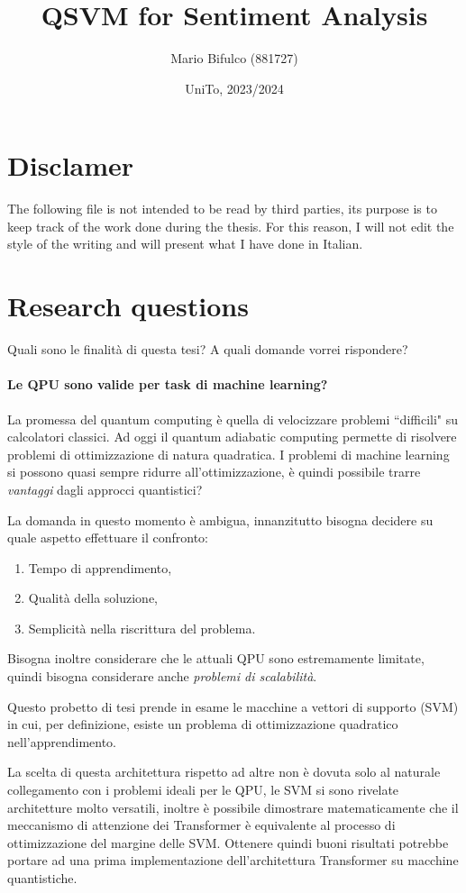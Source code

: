 \documentclass[12pt]{article}
\title{QSVM for Sentiment Analysis}
\author{Mario Bifulco (881727)}
\date{UniTo, 2023/2024}
\begin{document}
\maketitle

\section{Disclamer}

The following file is not intended to be read by third parties, 
its purpose is to keep track of the work done during the thesis. 
For this reason, I will not edit the style of the writing and will present what I have done in Italian.

\section{Research questions}

Quali sono le finalità di questa tesi? A quali domande vorrei rispondere?

\paragraph{Le QPU sono valide per task di machine learning?} 
La promessa del quantum computing è quella di velocizzare problemi “difficili" su calcolatori classici.
Ad oggi il quantum adiabatic computing permette di risolvere problemi di ottimizzazione di natura quadratica.
I problemi di machine learning si possono quasi sempre ridurre all'ottimizzazione, 
è quindi possibile trarre \emph{vantaggi} dagli approcci quantistici?

La domanda in questo momento è ambigua, innanzitutto bisogna decidere su quale aspetto effettuare il confronto:
\begin{enumerate}
    \item Tempo di apprendimento,
    \item Qualità della soluzione,
    \item Semplicità nella riscrittura del problema.
\end{enumerate}
Bisogna inoltre considerare che le attuali QPU sono estremamente limitate, 
quindi bisogna considerare anche \emph{problemi di scalabilità}.

Questo probetto di tesi prende in esame le macchine a vettori di supporto (SVM) in cui, per definizione, 
esiste un problema di ottimizzazione quadratico nell'apprendimento.

La scelta di questa architettura rispetto ad altre non è dovuta solo al naturale collegamento con i problemi ideali per le QPU,
le SVM si sono rivelate architetture molto versatili, inoltre è possibile dimostrare matematicamente che il meccanismo di attenzione dei Transformer è equivalente al processo di ottimizzazione del margine delle SVM.
Ottenere quindi buoni risultati potrebbe portare ad una prima implementazione dell'architettura Transformer su macchine quantistiche.
\end{document}
